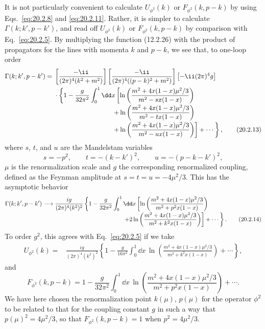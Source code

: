 It is not particularly convenient to calculate $U_{\phi^2}(k)$ or
$F_{\phi^2}(k,p-k)$ by using Eqs.~\eqref{eq:20.2.8} and
\eqref{eq:20.2.11}. Rather, it is simpler to calculate
$\Gamma(k;k',p-k')$, and read off $U_{\phi^2}(k)$ or
$F_{\phi^2}(k,p-k)$ by comparison with Eq.~\eqref{eq:20.2.5}. By
multiplying the function (12.2.26) with the product of propagators for the
lines with momenta $k$ and $p-k$, we see that, to one-loop order
\begin{align}
 \Gamma(k;k',p-k')={}&
 \left[\frac{-\ii}{(2\pi)^4(k^2+m^2)}\right]
 \left[\frac{-\ii}{(2\pi)^4((p-k)^2+m^2)}\right]
 \left[-\ii(2\pi)^4g\right]
 \notag\\
 &\cdot\left\{1-\frac{g}{32\pi^2}\int_0^1\dd x
 \left[
 \ln\left(\frac{m^2+4x(1-x)\mu^2/3}{m^2-sx(1-x)}\right)
 \right.\right.
 \notag\\[-2pt]
 &\hspace{31mm}\left.\left.
 +\ln\left(\frac{m^2+4x(1-x)\mu^2/3}{m^2-tx(1-x)}\right)
 \right.\right.
 \notag\\[-2pt]
 &\hspace{31mm}\left.\left.
 +\ln\left(\frac{m^2+4x(1-x)\mu^2/3}{m^2-ux(1-x)}\right)
 \right]+\cdots\right\},
 \tag{20.2.13}\label{eq:20.2.13}
\end{align}
where $s$, $t$, and $u$ are the Mandelstam variables
\[
 s=-p^2,\qquad t=-(k-k')^2,\qquad u=-(p-k-k')^2,
\]
$\mu$ is the renormalization scale and $g$ the corresponding renormalized
coupling, defined as the Feynman amplitude at
$s=t=u=-4\mu^2/3$. This has the asymptotic behavior
\begin{align}
 \Gamma(k;k',p-k')\longrightarrow{}&
 \frac{ig}{(2\pi)^4(k^2)^2}
 \left\{1-\frac{g}{32\pi^2}\int_0^1\dd x
 \left[
 \ln\left(\frac{m^2+4x(1-x)\mu^2/3}
 {m^2+p^2x(1-x)}\right)
 \right.\right.
 \notag\\[-2pt]
 &\hspace{40mm}\left.\left.
 +2\ln\left(\frac{m^2+4x(1-x)\mu^2/3}
 {m^2+k^2x(1-x)}\right)
 \right]+\cdots\right\}.
 \tag{20.2.14}\label{eq:20.2.14}
\end{align}
To order $g^2$, this agrees with Eq.~\eqref{eq:20.2.5} if we take
\begin{align}
 U_{\phi^2}(k)={}&\frac{ig}{(2\pi)^4(k^2)^2}
 \left\{1-\frac{g}{16\pi^2}\int_0^1\dd x\,
 \ln\left(\frac{m^2+4x(1-x)\mu^2/3}
 {m^2+k^2x(1-x)}\right)+\cdots\right\},
 \tag{20.2.15}\label{eq:20.2.15}
\end{align}
and
\begin{equation}
 F_{\phi^2}(k,p-k)=1-\frac{g}{32\pi^2}\int_0^1\dd x\,
 \ln\left(\frac{m^2+4x(1-x)\mu^2/3}
 {m^2+p^2x(1-x)}\right)+\cdots.
 \tag{20.2.16}\label{eq:20.2.16}
\end{equation}
We have here chosen the renormalization point $k(\mu)$, $p(\mu)$ for the
operator $\phi^2$ to be related to that for the coupling constant $g$ in
such a way that $p(\mu)^2=4\mu^2/3$, so that $F_{\phi^2}(k,p-k)=1$ when
$p^2=4\mu^2/3$.

